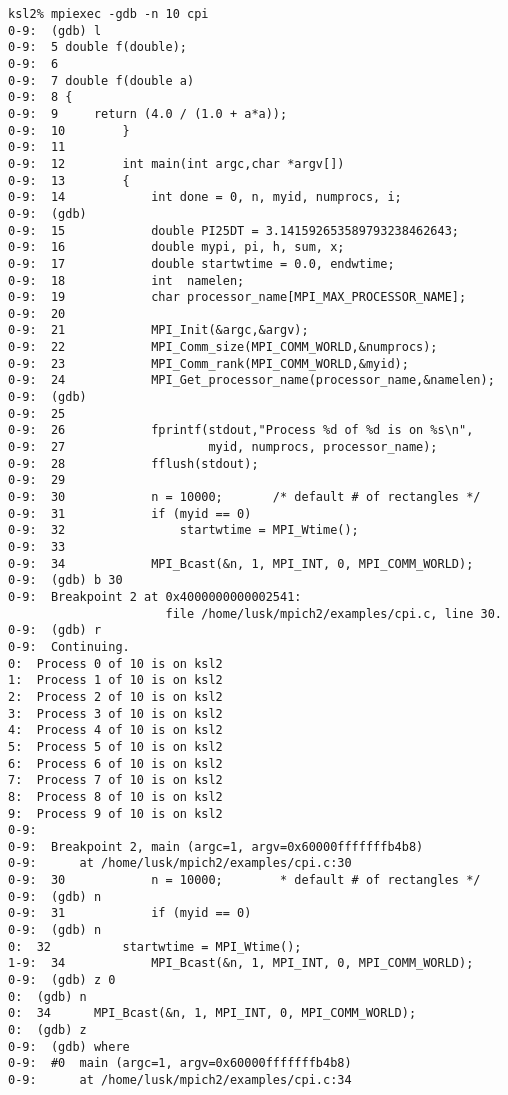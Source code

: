 \documentclass[dvipdfm,11pt]{article}
\begin{document}
%
\begin{small}
\begin{verbatim}
ksl2% mpiexec -gdb -n 10 cpi
0-9:  (gdb) l
0-9:  5 double f(double);
0-9:  6 
0-9:  7 double f(double a)
0-9:  8 {
0-9:  9     return (4.0 / (1.0 + a*a));
0-9:  10        }
0-9:  11        
0-9:  12        int main(int argc,char *argv[])
0-9:  13        {
0-9:  14            int done = 0, n, myid, numprocs, i;
0-9:  (gdb) 
0-9:  15            double PI25DT = 3.141592653589793238462643;
0-9:  16            double mypi, pi, h, sum, x;
0-9:  17            double startwtime = 0.0, endwtime;
0-9:  18            int  namelen;
0-9:  19            char processor_name[MPI_MAX_PROCESSOR_NAME];
0-9:  20        
0-9:  21            MPI_Init(&argc,&argv);
0-9:  22            MPI_Comm_size(MPI_COMM_WORLD,&numprocs);
0-9:  23            MPI_Comm_rank(MPI_COMM_WORLD,&myid);
0-9:  24            MPI_Get_processor_name(processor_name,&namelen);
0-9:  (gdb) 
0-9:  25        
0-9:  26            fprintf(stdout,"Process %d of %d is on %s\n",
0-9:  27                    myid, numprocs, processor_name);
0-9:  28            fflush(stdout);
0-9:  29        
0-9:  30            n = 10000;       /* default # of rectangles */
0-9:  31            if (myid == 0)
0-9:  32                startwtime = MPI_Wtime();
0-9:  33        
0-9:  34            MPI_Bcast(&n, 1, MPI_INT, 0, MPI_COMM_WORLD);
0-9:  (gdb) b 30
0-9:  Breakpoint 2 at 0x4000000000002541: 
                      file /home/lusk/mpich2/examples/cpi.c, line 30.
0-9:  (gdb) r
0-9:  Continuing.
0:  Process 0 of 10 is on ksl2
1:  Process 1 of 10 is on ksl2
2:  Process 2 of 10 is on ksl2
3:  Process 3 of 10 is on ksl2
4:  Process 4 of 10 is on ksl2
5:  Process 5 of 10 is on ksl2
6:  Process 6 of 10 is on ksl2
7:  Process 7 of 10 is on ksl2
8:  Process 8 of 10 is on ksl2
9:  Process 9 of 10 is on ksl2
0-9:  
0-9:  Breakpoint 2, main (argc=1, argv=0x60000fffffffb4b8)
0-9:      at /home/lusk/mpich2/examples/cpi.c:30
0-9:  30            n = 10000;        * default # of rectangles */
0-9:  (gdb) n
0-9:  31            if (myid == 0)
0-9:  (gdb) n
0:  32          startwtime = MPI_Wtime();
1-9:  34            MPI_Bcast(&n, 1, MPI_INT, 0, MPI_COMM_WORLD);
0-9:  (gdb) z 0
0:  (gdb) n
0:  34      MPI_Bcast(&n, 1, MPI_INT, 0, MPI_COMM_WORLD);
0:  (gdb) z
0-9:  (gdb) where
0-9:  #0  main (argc=1, argv=0x60000fffffffb4b8)
0-9:      at /home/lusk/mpich2/examples/cpi.c:34

\end{verbatim}
\end{small}
\end{document}

